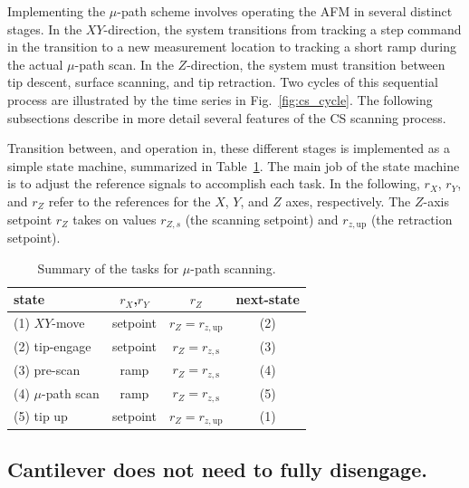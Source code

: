 \documentclass[journal]{IEEEtran}
\newcommand{\rzup}{\ensuremath{r_{z,\textrm{up}}}\xspace}
\newcommand{\rzs}{\ensuremath{r_{z,\textrm{s}}}\xspace}
\begin{document}
Implementing the $\mu$-path scheme involves operating the AFM in
several distinct stages. In the $XY$-direction, the system transitions
from tracking a step command in the transition to a new measurement
location to tracking a short ramp during the actual $\mu$-path scan.
In the $Z$-direction, the system must transition between tip descent,
surface scanning, and tip retraction. Two cycles of this sequential
process are illustrated by the time series in Fig.~\ref{fig:cs_cycle}.
The following subsections describe in more detail several features of
the CS scanning process.

Transition between, and operation in, these different stages is
implemented as a simple state machine, summarized in
Table~\ref{tab:cs_tasks}. The main job of the state machine is to
adjust the reference signals to accomplish each task. In the
following, $r_X$, $r_Y$, and $r_Z$ refer to the references for the
$X$, $Y$, and $Z$ axes, respectively. The $Z$-axis setpoint $r_Z$
takes on values $r_{Z,s}$ (the scanning setpoint) and $\rzup$ (the
retraction setpoint).

\begin{table}[h!]
  \centering
  \caption{Summary of the tasks for $\mu$-path scanning.}
  \begin{tabular}{lccc}
    state & $r_X$,$r_Y$ & $r_Z$ & next-state\\
    \toprule
    (1) $XY$-move & setpoint & $r_Z = \rzup$ & (2)\\
    (2) tip-engage & setpoint & $r_Z = \rzs$ & (3)\\
    (3) pre-scan & ramp & $r_Z = \rzs$ & (4)\\
    (4) $\mu$-path scan & ramp & $r_Z = \rzs$ & (5)\\
    (5) tip up & setpoint & $r_Z = \rzup$ & (1)\\
  \end{tabular}
  \label{tab:cs_tasks}
\end{table}

  
\subsection{Cantilever does not need to fully disengage.}
  
\end{document}
